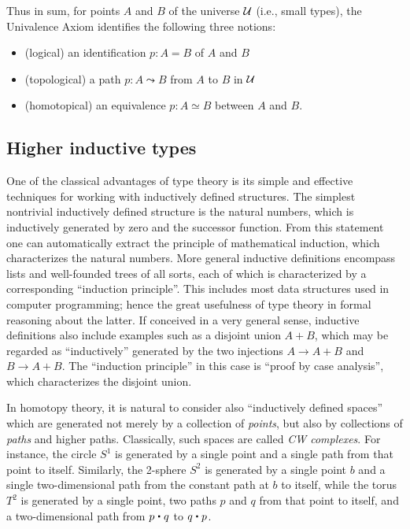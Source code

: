 {Thus in sum, for points $A$ and $B$ of the universe $\mathcal{U}$ (i.e., small types), the Univalence Axiom identifies the following three notions:
\begin{itemize}
\item (logical) an identification $p:A=B$ of $A$ and $B$
\item (topological) a path $p:A \leadsto B$ from $A$ to $B$ in $\mathcal{U}$
\item (homotopical) an equivalence $p:A\simeq B$ between $A$ and $B$.
\end{itemize}


\subsection*{Higher inductive types}

One of the classical advantages of type theory is its simple and effective techniques for working with inductively defined structures.
The simplest nontrivial inductively defined structure is the natural numbers, which is inductively generated by zero and the successor function.
From this statement one can automatically extract the principle of mathematical induction, which characterizes the natural numbers.
More general inductive definitions encompass lists and well-founded trees of all sorts, each of which is characterized by a corresponding ``induction principle''.
This includes most data structures used in computer programming; hence the great usefulness of type theory in formal reasoning about the latter.
If conceived in a very general sense, inductive definitions also include examples such as a disjoint union $A+B$, which may be regarded as ``inductively'' generated by the two injections $A\to A+B$ and $B\to A+B$.
The ``induction principle'' in this case is ``proof by case analysis'', which characterizes the disjoint union.

In homotopy theory, it is natural to consider also ``inductively defined spaces'' which are generated not merely by a collection of \emph{points}, but also by collections of \emph{paths} and higher paths.
Classically, such spaces are called \emph{CW complexes}.
For instance, the circle $S^1$ is generated by a single point and a single path from that point to itself.
Similarly, the 2-sphere $S^2$ is generated by a single point $b$ and a single two-dimensional path from the constant path at $b$ to itself, while the torus $T^2$ is generated by a single point, two paths $p$ and $q$ from that point to itself, and a two-dimensional path from $p\ct q$ to $q\ct p$.

}

